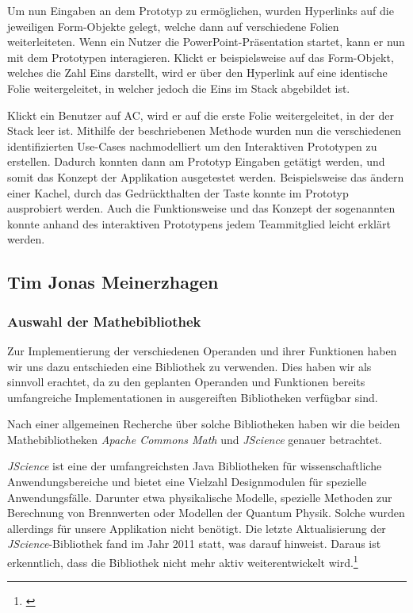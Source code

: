 Um nun Eingaben an dem Prototyp zu ermöglichen, wurden Hyperlinks auf die jeweiligen Form-Objekte gelegt, welche dann auf verschiedene Folien weiterleiteten. Wenn ein Nutzer die PowerPoint-Präsentation startet, kann er nun mit dem Prototypen interagieren. Klickt er beispielsweise auf das Form-Objekt, welches die Zahl Eins darstellt, wird er über den Hyperlink auf eine identische Folie weitergeleitet, in welcher jedoch die Eins im Stack abgebildet ist. 

Klickt ein Benutzer auf AC, wird er auf die erste Folie weitergeleitet, in der der Stack leer ist. Mithilfe der beschriebenen Methode wurden nun die verschiedenen identifizierten Use-Cases nachmodelliert um den Interaktiven Prototypen zu erstellen. Dadurch konnten dann am Prototyp Eingaben getätigt werden, und somit das Konzept der Applikation ausgetestet werden. Beispielsweise das ändern einer Kachel, durch das Gedrückthalten der Taste konnte im Prototyp ausprobiert werden. Auch die Funktionsweise und das Konzept der sogenannten  konnte anhand des interaktiven Prototypens jedem Teammitglied leicht erklärt werden. 

\clearpage

\subsection{Tim Jonas Meinerzhagen}

\subsubsection{Auswahl der Mathebibliothek}

Zur Implementierung der verschiedenen Operanden und ihrer Funktionen haben wir uns dazu entschieden eine Bibliothek zu verwenden. Dies haben wir als sinnvoll erachtet, da zu den geplanten Operanden und Funktionen bereits umfangreiche Implementationen in ausgereiften Bibliotheken verfügbar sind.

Nach einer allgemeinen Recherche über solche Bibliotheken haben wir die beiden Mathebibliotheken \textit{Apache Commons Math} und \textit{JScience} genauer betrachtet. 

\textit{JScience} ist eine der umfangreichsten Java Bibliotheken für wissenschaftliche Anwendungsbereiche und bietet eine Vielzahl Designmodulen für spezielle Anwendungsfälle. Darunter etwa physikalische Modelle, spezielle Methoden zur Berechnung von Brennwerten oder Modellen der Quantum Physik. Solche wurden allerdings für unsere Applikation nicht benötigt. Die letzte Aktualisierung der \textit{JScience}-Bibliothek fand im Jahr 2011 statt, was darauf hinweist. Daraus ist erkenntlich, dass die Bibliothek nicht mehr aktiv weiterentwickelt wird.\footnote{\cite[vgl.][]{dautelle2014}}

